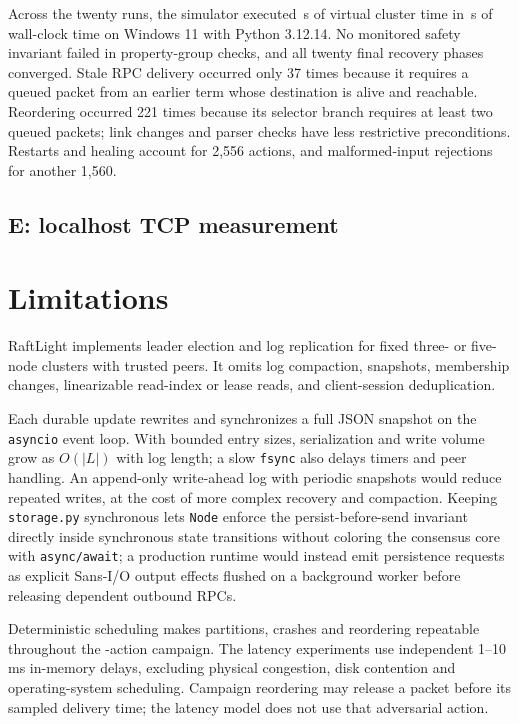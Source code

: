 \documentclass[10pt,a4paper]{article}
\begin{document}
Across the twenty runs, the simulator executed \SimulationSeconds{}\,s of
virtual cluster time in \CampaignWallSeconds{}\,s of wall-clock time on Windows
11 with Python 3.12.14. No monitored safety invariant failed in \CheckCount{}
property-group checks, and all twenty final recovery phases converged.
Stale RPC delivery occurred only 37 times because it requires a queued packet
from an earlier term whose destination is alive and reachable. Reordering
occurred 221 times because its selector branch requires at least two queued
packets; link changes and parser checks have less restrictive preconditions.
Restarts and healing account for 2,556 actions, and malformed-input rejections
for another 1,560.

\subsection{E: localhost TCP measurement}
\TCPFindings{}

\section{Limitations}
RaftLight implements leader election and log replication for fixed three- or
five-node clusters with trusted peers. It omits log compaction, snapshots,
membership changes, linearizable read-index or lease reads, and client-session
deduplication.

Each durable update rewrites and synchronizes a full JSON snapshot on the
\texttt{asyncio} event loop. With bounded entry sizes, serialization and write
volume grow as $O(|L|)$ with log length; a slow \texttt{fsync} also delays timers
and peer handling. An append-only write-ahead log with periodic snapshots would
reduce repeated writes, at the cost of more complex recovery and compaction.
Keeping \texttt{storage.py} synchronous lets \texttt{Node} enforce the
persist-before-send invariant directly inside synchronous state transitions
without coloring the consensus core with \texttt{async/await}; a production
runtime would instead emit persistence requests as explicit Sans-I/O output
effects flushed on a background worker before releasing dependent outbound RPCs.

Deterministic scheduling makes partitions, crashes and reordering repeatable
throughout the \FaultCount{}-action campaign. The latency experiments use
independent 1--10\,ms in-memory delays, excluding physical congestion, disk
contention and operating-system scheduling. Campaign reordering may release a
packet before its sampled delivery time; the latency model does not use that
adversarial action.
\end{document}
